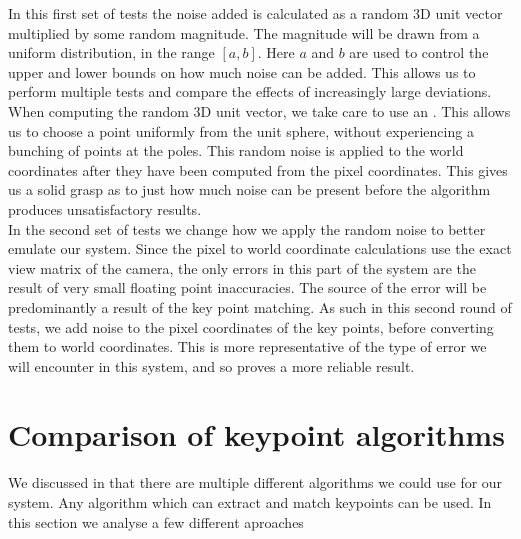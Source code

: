 In this first set of tests the noise added is calculated as a random 3D unit vector multiplied by some random magnitude. The magnitude will be drawn from a uniform distribution, in the range $[a,b]$. Here $a$ and $b$ are used to control the upper and lower bounds on how much noise can be added. This allows us to perform multiple tests and compare the effects of increasingly large deviations.\\
When computing the random 3D unit vector, we take care to use an  \cite{uniform-3d-vector, cylinder-proj, random-vector}. This allows us to choose a point uniformly from the unit sphere, without experiencing a bunching of points at the poles. This random noise is applied to the world coordinates after they have been computed from the pixel coordinates. This gives us a solid grasp as to just how much noise can be present before the algorithm produces unsatisfactory results.\\

In the second set of tests we change how we apply the random noise to better emulate our system. Since the pixel to world coordinate calculations use the exact view matrix of the camera, the only errors in this part of the system are the result of very small floating point inaccuracies. The source of the error will be predominantly a result of the key point matching. As such in this second round of tests, we add noise to the pixel coordinates of the key points, before converting them to world coordinates. This is more representative of the type of error we will encounter in this system, and so proves a more reliable result.

\section{Comparison of keypoint algorithms}
We discussed in  that there are multiple different algorithms we could use for our system. Any algorithm which can extract and match keypoints can be used. In this section we analyse a few different aproaches 

